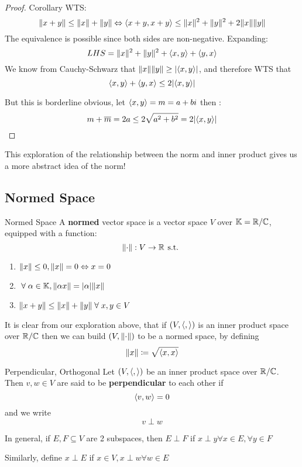 \begin{proof} {Corollary}
    WTS: \[
        \lVert x + y\rVert \leq \lVert x\rVert + \lVert y\rVert \Leftrightarrow \langle x+y, x+y \rangle \leq \lVert x\rVert^2 + \lVert y\rVert^2 + 2 \lVert x\rVert\lVert y\rVert
    \]
    The equivalence is possible since both sides are non-negative. Expanding:
    \[
        LHS = \lVert x\rVert^2 + \lVert y\rVert^2 + \langle x, y \rangle + \langle y, x \rangle
    \]
    We know from Cauchy-Schwarz that \(\lVert x\rVert \lVert y\rVert \geq \lvert\langle x, y \rangle\rvert\), and therefore WTS that \[
        \langle x, y \rangle + \langle y, x \rangle \leq 2 \lvert\langle x, y \rangle\rvert
    \]

    But this is borderline obvious, let \(\langle x, y \rangle = m = a + bi\) then : \[
        m + \overline{m} = 2 a \leq 2 \sqrt{a^2 + b^2} = 2 \lvert\langle x, y \rangle\rvert
    \]
\end{proof}

This exploration of the relationship between the norm and inner product gives us a more abstract idea of the norm!

\subsection{Normed Space}
\begin{definition} {Normed Space}
    A \textbf{normed} vector space is a vector space \(V\) over \(\mathbb{K} = \mathbb{R} / \mathbb{C}\), equipped with a function: \[
        \lVert\cdot\rVert: V \to \mathbb{R} \hspace*{4pt}\text{s.t.}\hspace*{4pt}
    \]
    \begin{enumerate}
        \item \(\lVert x\rVert \leq 0, \lVert x\rVert = 0 \Leftrightarrow x = 0 \)
        \item \(\forall \alpha \in \bbk, \norm{\alpha x} = \abs{\alpha} \norm{x}\)
        \item \(\norm{x + y} \leq \norm{x} + \norm{y} \forall x, y \in V\)
    \end{enumerate}
\end{definition}

\begin{remark}
    It is clear from our exploration above, that if \((V, \langle ,  \rangle)\) is an inner product space over \(\mathbb{R} / \mathbb{C}\) then we can build \((V, \lVert\cdot\rVert)\) to be a normed space, by defining \[
        \lVert x\rVert \coloneqq \sqrt{\langle x, x \rangle}
    \]
\end{remark}

\begin{definition} {Perpendicular, Orthogonal}
    Let \((V, \langle ,  \rangle)\) be an inner product space over \(\mathbb{R} / \mathbb{C}\). Then \(v, w \in V\) are said to be \textbf{perpendicular} to each other if \[
        \langle v, w \rangle = 0
    \]
    and we write \[
        v \perp w
    \]

    In general, if \(E, F \subseteq V\) are 2 subspaces, then \(E \perp F\) if \(x \perp y \forall x \in E, \forall y \in F\)

    Similarly, define \(x \perp E\) if \(x \in V, x \perp w \forall w \in E\)
\end{definition}

